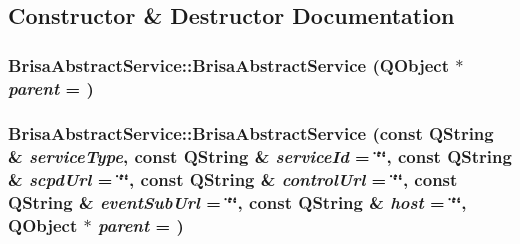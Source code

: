 \subsection{Constructor \& Destructor Documentation}
\hypertarget{classBrisaUpnp_1_1BrisaAbstractService_a490898486e9a4c5df805c9af816a175b}{
\subsubsection[{BrisaAbstractService}]{\setlength{\rightskip}{0pt plus 5cm}BrisaAbstractService::BrisaAbstractService (QObject $\ast$ {\em parent} = {})}}
\label{classBrisaUpnp_1_1BrisaAbstractService_a490898486e9a4c5df805c9af816a175b}
\hypertarget{classBrisaUpnp_1_1BrisaAbstractService_a1f94514c2e0215ef56c06eca6ae791d7}{
\subsubsection[{BrisaAbstractService}]{\setlength{\rightskip}{0pt plus 5cm}BrisaAbstractService::BrisaAbstractService (const QString \& {\em serviceType}, \/  const QString \& {\em serviceId} = {\ttfamily \char`\"{}\char`\"{}}, \/  const QString \& {\em scpdUrl} = {\ttfamily \char`\"{}\char`\"{}}, \/  const QString \& {\em controlUrl} = {\ttfamily \char`\"{}\char`\"{}}, \/  const QString \& {\em eventSubUrl} = {\ttfamily \char`\"{}\char`\"{}}, \/  const QString \& {\em host} = {\ttfamily \char`\"{}\char`\"{}}, \/  QObject $\ast$ {\em parent} = {})}}
\label{classBrisaUpnp_1_1BrisaAbstractService_a1f94514c2e0215ef56c06eca6ae791d7}


